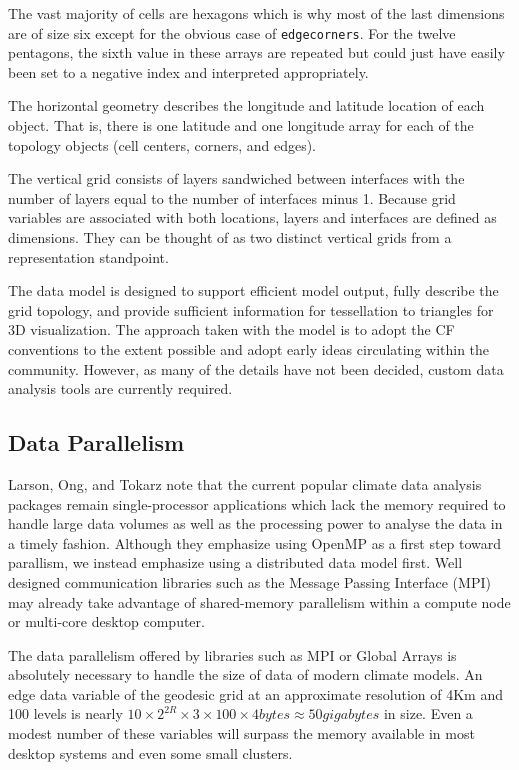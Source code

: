 The vast majority of cells are hexagons which is why most of the last
dimensions are of size six except for the obvious case of \verb+edgecorners+.
For the twelve pentagons, the sixth value in these arrays are repeated but
could just have easily been set to a negative index and interpreted
appropriately.

The horizontal geometry describes the longitude and latitude location of each
object.  That is, there is one latitude and one longitude array for each of
the topology objects (cell centers, corners, and edges).

The vertical grid consists of layers sandwiched between interfaces with the
number of layers equal to the number of interfaces minus 1.   Because grid
variables are associated with both locations, layers and interfaces are
defined as dimensions.  They can be thought of as two distinct vertical grids
from a representation standpoint.

The data model is designed to support efficient model output, fully describe
the grid topology, and provide sufficient information for tessellation to
triangles for 3D visualization.  The approach taken with the model is to adopt
the CF conventions to the extent possible and adopt early ideas circulating
within the community.  However, as many of the details have not been decided,
custom data analysis tools are currently required.

\subsection{Data Parallelism}

Larson, Ong, and Tokarz note that the current popular climate data analysis
packages remain single-processor applications which lack the memory required
to handle large data volumes as well as the processing power to analyse the
data in a timely fashion\cite{MODSIM07:LOT}.  Although they emphasize using
OpenMP as a first step toward parallism, we instead emphasize using a
distributed data model first.  Well designed communication libraries such as
the Message Passing Interface (MPI)\cite{MPI} may already take advantage of
shared-memory parallelism within a compute node or multi-core desktop
computer.

The data parallelism offered by libraries such as MPI or Global Arrays is
absolutely necessary to handle the size of data of modern climate models.  An
edge data variable of the geodesic grid at an approximate resolution of 4Km
and 100 levels is nearly $10 \times 2^{2R} \times 3 \times 100 \times 4
\unit{bytes} \approx 50 \unit{gigabytes}$ in size.  Even a modest number of
these variables will surpass the memory available in most desktop systems and
even some small clusters.

